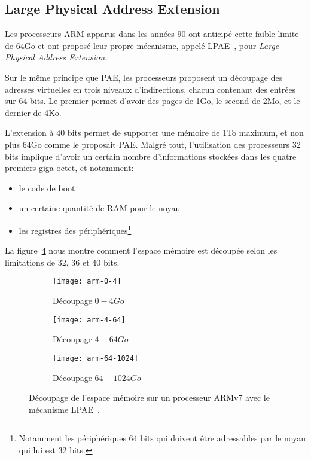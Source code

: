     \subsection{Large Physical Address Extension}

    Les processeurs ARM apparus dans les années 90 ont anticipé cette faible
    limite de 64Go et ont proposé leur propre mécanisme, appelé
    LPAE~\citep{arm2012principles,marinas2011linux}, pour \textit{Large Physical
      Address Extension}.

    Sur le même principe que PAE, les processeurs proposent un découpage des
    adresses virtuelles en trois niveaux d'indirections, chacun contenant des
    entrées sur 64 bits. Le premier permet d'avoir des pages de 1Go, le second
    de 2Mo, et le dernier de 4Ko.

    L'extension à 40 bits permet de supporter une mémoire de 1To maximum, et non
    plus 64Go comme le proposait PAE. Malgré tout, l'utilisation des processeurs
    32 bits implique d'avoir un certain nombre d'informations stockées dans les
    quatre premiers giga-octet, et notamment:

    \begin{itemize}
      \item le code de boot
      \item un certaine quantité de RAM pour le noyau
      \item les registres des périphériques\footnote{Notamment les périphériques
        64 bits qui doivent être adressables par le noyau qui lui est 32 bits.}
    \end{itemize}

    La figure~\ref{fig:arm-0-1024} nous montre comment l'espace mémoire est
    découpée selon les limitations de 32, 36 et 40 bits.

    \begin{figure}[ht]
      \begin{subfigure}[b]{0.37\textwidth}
        \texttt{[image: arm-0-4]}
        \caption{Découpage $0-4Go$}
        \label{fig:arm-0-4}
      \end{subfigure}
      \begin{subfigure}[b]{0.37\textwidth}
        \texttt{[image: arm-4-64]}
        \caption{Découpage $4-64Go$}
        \label{fig:arm-4-64}
      \end{subfigure}
      \begin{subfigure}[b]{0.23\textwidth}
        \texttt{[image: arm-64-1024]}
        \caption{Découpage $64-1024Go$}
        \label{fig:arm-64-1024}
      \end{subfigure}
      \caption{Découpage de l'espace mémoire sur un processeur ARMv7 avec le
        mécanisme LPAE~\citep{arm2012principles}.}
      \label{fig:arm-0-1024}
    \end{figure}

